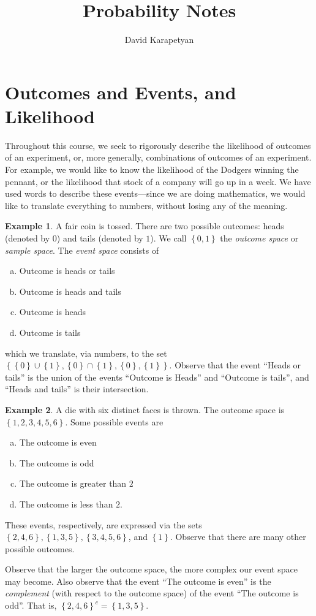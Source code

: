 \documentclass[12pt]{article}
\theoremstyle{plain}
\theoremstyle{definition}
\newtheorem*{example}{Example}
\theoremstyle{remark}
\numberwithin{equation}{section}  %
\begin{document}
\title{Probability Notes}
\author{David Karapetyan}
\date{}
\maketitle
\newpage
\setcounter{tocdepth}{2}
\setcounter{secnumdepth}{1}
\tableofcontents
\newpage
\section{Outcomes and Events, and Likelihood}
	Throughout this course, we seek to rigorously describe the likelihood of
	outcomes of an experiment, or, more generally, combinations of outcomes of an experiment.
	For example, we would like to know the likelihood of the Dodgers
	winning the pennant, or the likelihood that stock of a company will go up
	in a week. We have used words to describe these events---since we are doing
	mathematics, we would like to translate everything to numbers, without losing
	any of the meaning.
\begin{example}
A fair coin is tossed. There are two possible outcomes: heads (denoted by $0$) 
and tails (denoted by $1$). We call $ \left\{ 0,1 \right\} $ the \emph{outcome
space} or \emph{sample space}. The \emph{event space} consists of
\begin{enumerate}[(a)]
\item Outcome is heads or tails
\item Outcome is heads and tails
\item Outcome is heads
\item Outcome is tails
\end{enumerate}
which we translate, via numbers, to the set $ \left\{ \left\{ 0 \right\} \cup
\left\{ 1 \right\}, \left\{ 0 \right\} \cap \left\{ 1 \right\} , \left\{ 0
\right\} , \left\{ 1 \right\} \right \}$.
Observe that the event ``Heads or tails'' is the union of the events
``Outcome is Heads'' and ``Outcome is tails'', and ``Heads and tails'' is
their intersection.
\end{example}	

\begin{example}
A die with six distinct faces is thrown. The outcome space is
$ \left\{ 1, 2, 3, 4, 5, 6 \right\} $. Some possible events are
\begin{enumerate}[(a)]
\item The outcome is even
\item The outcome is odd
\item The outcome is greater than $2$
\item The outcome is less than $2$.
\end{enumerate}
These events, respectively, are expressed via the sets
$ \left\{ 2, 4, 6 \right\} , \left\{ 1,3,5 \right\} , \left\{ 3, 4, 5, 6
\right\}$, and $\left\{ 1 \right\}$.
Observe that there are many other possible outcomes.
\end{example}
Observe that the larger the outcome space, the more complex
our event space may become. Also observe that the event
``The outcome is even'' is the \emph{complement} (with respect to the
outcome space) of
the event ``The outcome is odd''. That is,
${\left\{ 2,4,6 \right\}}^c
= \left\{ 1,3,5 \right\}$.
\end{document}
